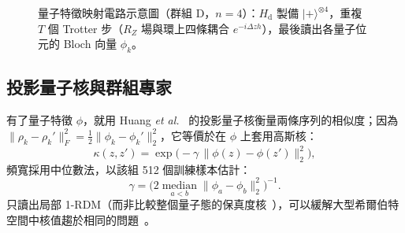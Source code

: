\documentclass[10pt,a4paper]{article}
\begin{document}
\begin{figure}[!t]
    \centering
    \caption{量子特徵映射電路示意圖（群組 D，$n=4$）：$H_{\mathrm{d}}$ 製備 $|{+}\rangle^{\otimes4}$，重複 $T$ 個 Trotter 步（$R_Z$ 場與環上四條耦合 $e^{-i\Delta z h}$），最後讀出各量子位元的 Bloch 向量 $\phi_k$。}
    \label{fig:viz-encoding}
\end{figure}

\subsection{投影量子核與群組專家}
\label{sec:kernel}

有了量子特徵 $\phi$，就用 Huang \textit{et al.}~\cite{huang2021power} 的投影量子核衡量兩條序列的相似度；因為 $\|\rho_k-\rho_k'\|_F^2=\tfrac12\|\phi_k-\phi_k'\|_2^2$，它等價於在 $\phi$ 上套用高斯核：
\begin{equation}
    \kappa(z,z')=\exp\!\big(-\gamma\,\|\phi(z)-\phi(z')\|_2^2\big),
    \label{eq:pqk}
\end{equation}
頻寬採用中位數法，以該組 512 個訓練樣本估計：
\begin{equation}
    \gamma=\Big(2\operatorname*{median}_{a<b}\|\phi_a-\phi_b\|_2^2\Big)^{-1}.
    \label{eq:median-gamma}
\end{equation}
只讀出局部 1-RDM（而非比較整個量子態的保真度核~\cite{havlicek2019}），可以緩解大型希爾伯特空間中核值趨於相同的問題~\cite{huang2021power}。
\end{document}
